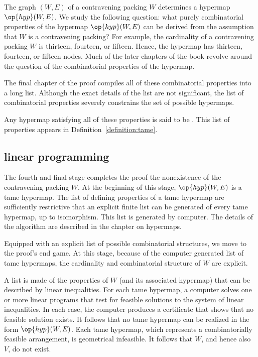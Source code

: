 The graph $(W,E)$ of a contravening packing $W$ determines a hypermap
$\op{hyp}(W,E)$. We study the following question: what  purely
combinatorial properties of the hypermap $\op{hyp}(W,E)$ can be derived from
the assumption  that
$W$ is a contravening packing?  For example, the cardinality of a
contravening packing $W$ is thirteen, fourteen, or fifteen.  Hence, the hypermap
has thirteen, fourteen, or fifteen nodes.  Much of the later chapters of the book
revolve around the question of the combinatorial properties of the
hypermap.

The final chapter of the proof compiles all of these combinatorial
properties into a long list.  
Although the exact details of the list are not significant,
the list of combinatorial properties severely constrains the set of possible
hypermaps.  

Any hypermap satisfying all of these properties is said to be
.  This list of properties appears in
Definition~\ref{definition:tame}.


\subsection{linear programming}

The fourth and final stage completes the proof the nonexistence of
the contravening packing $W$.  At the beginning of this stage,
$\op{hyp}(W,E)$ is a tame hypermap.  The list of defining properties
of a tame hypermap are sufficiently restrictive that an explicit finite
list can be generated of every tame hypermap, up to isomorphism.  
This list is generated by computer.  The details of the algorithm are
described in the chapter on hypermaps.

Equipped with an explicit list of possible combinatorial structures,
we move to the proof's end game.  At this stage, because of the computer
generated list of tame hypermaps, the cardinality and
combinatorial structure of $W$ are explicit.

A list is made of the properties of $W$ (and its associated hypermap)
that can be described by linear inequalities.  For each tame hypermap,
a computer solves one or more linear programs that test for feasible
solutions to the system of linear inequalities.  In each case, the
computer produces a certificate that shows that no feasible solution
exists.  It follows that no tame hypermap can be realized in the form
$\op{hyp}(W,E)$.  Each tame hypermap, which represents a
combinatorially feasible arrangement, is geometrical infeasible.  It
follows that $W$, and hence also $V$, do not exist.

